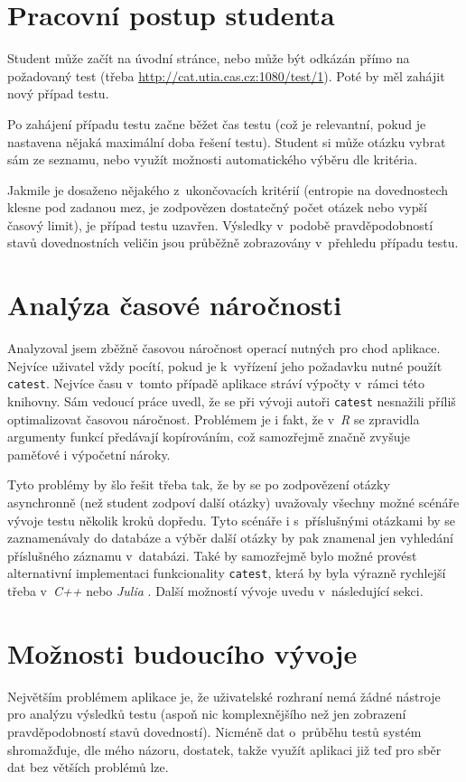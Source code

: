 \documentclass[a4paper,twoside,12pt]{scrbook}
\begin{document}
\section{Pracovní postup studenta}
Student může začít na úvodní stránce, nebo může být odkázán přímo na požadovaný test (třeba \url{http://cat.utia.cas.cz:1080/test/1}). Poté by měl zahájit nový případ testu.

Po zahájení případu testu začne běžet čas testu (což je relevantní, pokud je nastavena nějaká maximální doba řešení testu). Student si může otázku vybrat sám ze seznamu, nebo využít možnosti automatického výběru dle kritéria.

Jakmile je dosaženo nějakého z~ukončovacích kritérií (entropie na dovednostech klesne pod zadanou mez, je zodpovězen dostatečný počet otázek nebo vypší časový limit), je případ testu uzavřen. Výsledky v~podobě pravděpodobností stavů dovednostních veličin jsou průběžně zobrazovány v~přehledu případu testu.

\section{Analýza časové náročnosti}
Analyzoval jsem zběžně časovou náročnost operací nutných pro chod aplikace. Nejvíce uživatel vždy pocítí, pokud je k~vyřízení jeho požadavku nutné použít \texttt{catest}. Nejvíce času v~tomto případě aplikace stráví výpočty v~rámci této knihovny. Sám vedoucí práce uvedl, že se při vývoji autoři \texttt{catest} nesnažili příliš optimalizovat časovou náročnost. Problémem je i fakt, že v~\textit{R} se zpravidla argumenty funkcí předávají kopírováním, což samozřejmě značně zvyšuje paměťové i výpočetní nároky.

Tyto problémy by šlo řešit třeba tak, že by se po zodpovězení otázky asynchronně (než student zodpoví další otázky) uvažovaly všechny možné scénáře vývoje testu několik kroků dopředu. Tyto scénáře i s~příslušnými otázkami by se zaznamenávaly do databáze a výběr další otázky by pak znamenal jen vyhledání příslušného záznamu v~databázi. Také by samozřejmě bylo možné provést alternativní implementaci funkcionality \texttt{catest}, která by byla výrazně rychlejší třeba v~\textit{C++} nebo \textit{Julia} \cite{julia}. Další možností vývoje uvedu v~následující sekci.

\section{Možnosti budoucího vývoje}
Největším problémem aplikace je, že uživatelské rozhraní nemá žádné nástroje pro analýzu výsledků testu (aspoň nic komplexnějšího než jen zobrazení pravděpodobností stavů dovedností). Nicméně dat o~průběhu testů systém shromažďuje, dle mého názoru, dostatek, takže využít aplikaci již teď pro sběr dat bez větších problémů lze.
\end{document}
